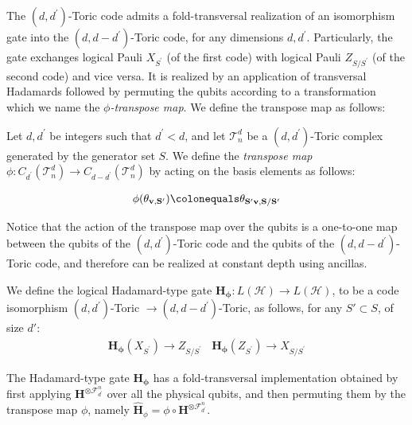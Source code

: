 
The $(d,d^{\prime})$-Toric code admits a fold-transversal realization of an isomorphism gate into the $(d,d-d^{\prime})$-Toric code, for any dimensions $d,d^{\prime}$. Particularly, the gate exchanges logical Pauli $X_{S^{\prime}}$ (of the first code) with logical Pauli $Z_{S/S^{\prime}}$ (of the second code) and vice versa. It is realized by an application of transversal Hadamards followed by permuting the qubits according to a transformation which we name the \textit{$\phi$-transpose map}. We define the transpose map as follows:
\begin{definition}
  \label{def:trans}
  Let $d, d^{\prime}$ be integers such that $d^{\prime} < d$, and let $\mathcal{T}^{d}_{n}$ be a $(d, d^{\prime})$-Toric complex generated by the generator set $S$.   We define the \textit{transpose map} $\phi : C_{d^{\prime}}(\mathcal{T}_n^d) \rightarrow C_{d - d^{\prime}}(\mathcal{T}_n^d)$ by acting on the basis elements as follows:

  \begin{equation*}
    \begin{split}
      \phi(\rotfv{v}{S^{\prime}}) \colonequals \rotfv{S^{\prime}v}{S/S^{\prime}} 
    \end{split}
  \end{equation*}
\end{definition}
Notice that the action of the transpose map over the qubits is a one-to-one map between the qubits of the $(d,d^{\prime})$-Toric code and the qubits of the $(d,d-d^{\prime})$-Toric code, and therefore can be realized at constant depth using ancillas.
\begin{definition}  
  \label{def:htrans}
We define the logical Hadamard-type gate $ \mathbf{H_{\phi}} \colon L (\mathcal{H}) \rightarrow L (\mathcal{H}) $, to be a code isomorphism $(d,d^{\prime})$-Toric $\rightarrow (d,d-d^{\prime})$-Toric, as follows, for any $ S' \subset S $, of size $ d' $:
  \begin{equation*}
    \begin{split}
      \mathbf{H_{\phi}} ( X_{S^{\prime}} )  \rightarrow Z_{S/S^{\prime}} \ \ \ \  \mathbf{H_{\phi}} ( Z_{S^{\prime}} )   \rightarrow X_{S/S^{\prime}} 
    \end{split}
  \end{equation*}
\end{definition}
\begin{claim}
  The Hadamard-type gate $ \mathbf{H_{\phi}}$ has a fold-transversal implementation obtained by first applying $\mathbf{H}^{\otimes\mathcal{F}_{d^\prime}^{n}}$ over all the physical qubits, and then permuting them by the transpose map $\phi$, namely $\mathbf{\hat{H}}_{\phi} = \phi \circ \mathbf{H}^{\otimes\mathcal{F}_{d^\prime}^{n}}$.
\end{claim}
